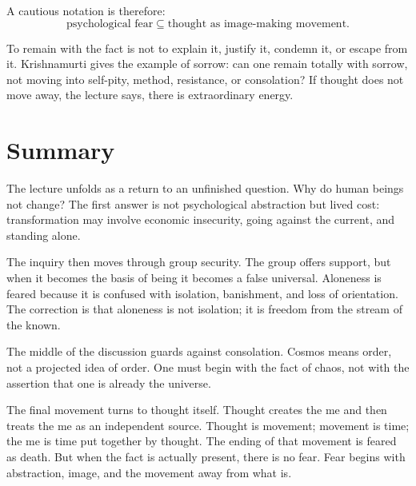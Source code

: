 A cautious notation is therefore:
\begin{equation}
\text{psychological fear}
\subseteq
\text{thought as image-making movement}.
\end{equation}

To remain with the fact is not to explain it, justify it, condemn it, or escape from it. Krishnamurti gives the example of sorrow: can one remain totally with sorrow, not moving into self-pity, method, resistance, or consolation? If thought does not move away, the lecture says, there is extraordinary energy.

\section{Summary}

The lecture unfolds as a return to an unfinished question. Why do human beings not change? The first answer is not psychological abstraction but lived cost: transformation may involve economic insecurity, going against the current, and standing alone.

The inquiry then moves through group security. The group offers support, but when it becomes the basis of being it becomes a false universal. Aloneness is feared because it is confused with isolation, banishment, and loss of orientation. The correction is that aloneness is not isolation; it is freedom from the stream of the known.

The middle of the discussion guards against consolation. Cosmos means order, not a projected idea of order. One must begin with the fact of chaos, not with the assertion that one is already the universe.

The final movement turns to thought itself. Thought creates the me and then treats the me as an independent source. Thought is movement; movement is time; the me is time put together by thought. The ending of that movement is feared as death. But when the fact is actually present, there is no fear. Fear begins with abstraction, image, and the movement away from what is.